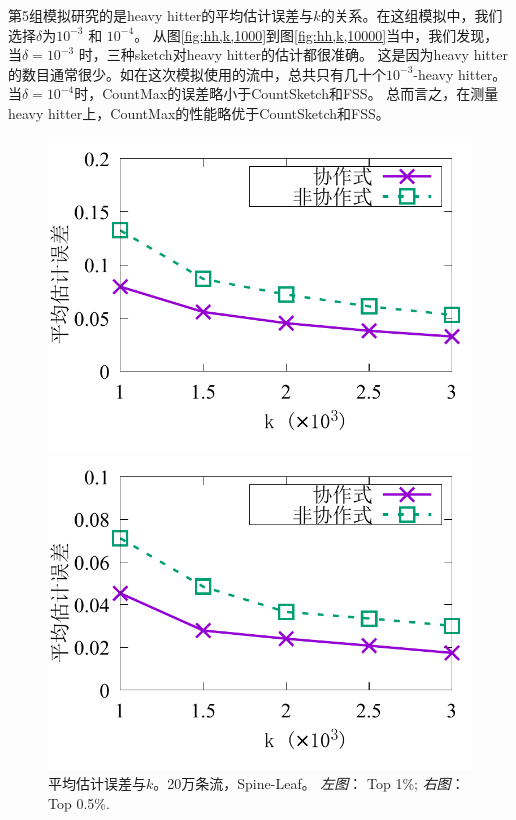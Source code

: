 第5组模拟研究的是heavy hitter的平均估计误差与$k$的关系。在这组模拟中，我们选择$\delta$为$10^{-3}$ 和 $10^{-4}$。
从图\ref{fig:hh,k,1000}到图\ref{fig:hh,k,10000}当中，我们发现，当$\delta =10^{-3}$ 时，三种sketch对heavy hitter的估计都很准确。
这是因为heavy hitter的数目通常很少。如在这次模拟使用的流中，总共只有几十个$10^{-3}$-heavy hitter。
当$\delta = 10^{-4}$时，CountMax的误差略小于CountSketch和FSS。
总而言之，在测量heavy hitter上，CountMax的性能略优于CountSketch和FSS。


\begin{figure}[ht]
	\centering
	\begin{minipage}[t]{0.49\linewidth}
		\centering
		\includegraphics[width=\linewidth]{fig/half_eg_099_k.pdf}
	\end{minipage}\vspace{-0.6em}%
	\begin{minipage}[t]{0.49\linewidth}
		\centering
		\includegraphics[width=\linewidth]{fig/half_eg_095_k.pdf}
	\end{minipage}\vspace{-0.6em}%
	\caption{\textnormal{平均估计误差与$k$。20万条流，Spine-Leaf。 \textit{左图}： Top 1\%; \textit{右图}： Top 0.5\%.}}
	\label{fig:coop,acc,k}
\end{figure}

